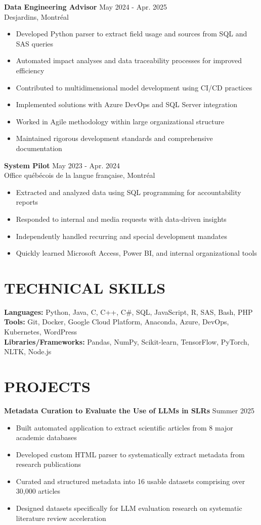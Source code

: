 \documentclass[11pt,a4paper]{article}
\newcommand{\experienceitem}[4]{
\noindent
  \textbf{#1} \hfill #2 \\
  #3 \vspace{2pt}
  #4 \vspace{8pt}
}
\newcommand{\projectitem}[3]{
\noindent
  \textbf{#1} \hfill #2 
  #3 \vspace{6pt}
}
\begin{document}
\experienceitem{Data Engineering Advisor}{May 2024 - Apr. 2025}{Desjardins, Montréal}{
  \begin{itemize}
    \item Developed Python parser to extract field usage and sources from SQL and SAS queries
    \item Automated impact analyses and data traceability processes for improved efficiency
    \item Contributed to multidimensional model development using CI/CD practices
    \item Implemented solutions with Azure DevOps and SQL Server integration
    \item Worked in Agile methodology within large organizational structure
    \item Maintained rigorous development standards and comprehensive documentation
  \end{itemize}
}

\experienceitem{System Pilot}{May 2023 - Apr. 2024}{Office québécois de la langue française, Montréal}{
  \begin{itemize}
    \item Extracted and analyzed data using SQL programming for accountability reports
    \item Responded to internal and media requests with data-driven insights
    \item Independently handled recurring and special development mandates
    \item Quickly learned Microsoft Access, Power BI, and internal organizational tools
  \end{itemize}
}

\section{TECHNICAL SKILLS}
\noindent
\textbf{Languages:} Python, Java, C, C++, C\#, SQL, JavaScript, R, SAS, Bash, PHP \\
\textbf{Tools:} Git, Docker, Google Cloud Platform, Anaconda, Azure, DevOps, Kubernetes, WordPress \\
\textbf{Libraries/Frameworks:} Pandas, NumPy, Scikit-learn, TensorFlow, PyTorch, NLTK, Node.js

\section{PROJECTS}
\projectitem{Metadata Curation to Evaluate the Use of LLMs in SLRs}{Summer 2025}{
  \begin{itemize}
    \item Built automated application to extract scientific articles from 8 major academic databases
    \item Developed custom HTML parser to systematically extract metadata from research publications
    \item Curated and structured metadata into 16 usable datasets comprising over 30,000 articles
    \item Designed datasets specifically for LLM evaluation research on systematic literature review acceleration
  \end{itemize}
}
\end{document}
